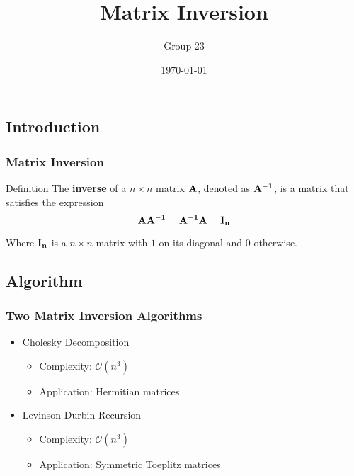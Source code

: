 \documentclass{beamer}
\title{Matrix Inversion}
\author{Group 23}
\institute{UM-SJTU Joint Institute}
\date{\today}
\begin{document}
\begin{frame}
	\titlepage
\end{frame}

\begin{frame}
	\tableofcontents
\end{frame}


\begin{frame}
	\section{Introduction}
	\frametitle{Matrix Inversion}
	\begin{block}{Definition}
		The {\bf  inverse} of a $n\times n$ matrix ${\bf A}$, denoted as ${\bf A^{-1}}$, is a matrix that satisfies the expression $${\bf AA^{-1}=A^{-1}A=I_n}$$

		Where ${\bf I_n}$ is a $n\times n$ matrix with $1$ on its diagonal and $0$ otherwise.
	\end{block}
\end{frame}


\begin{frame}
	\section{Algorithm}
	\frametitle{Two Matrix Inversion Algorithms}
	\begin{itemize}
		\item Cholesky Decomposition 
		\begin{itemize}
			\item Complexity: $\mathcal{O}(n^3)$
			\item Application: Hermitian matrices
		\end{itemize}
		\item Levinson-Durbin Recursion
		\begin{itemize}
			\item Complexity: $\mathcal{O}(n^3)$
			\item Application: Symmetric Toeplitz matrices
		\end{itemize}
	\end{itemize}
\end{frame}
\end{document}
